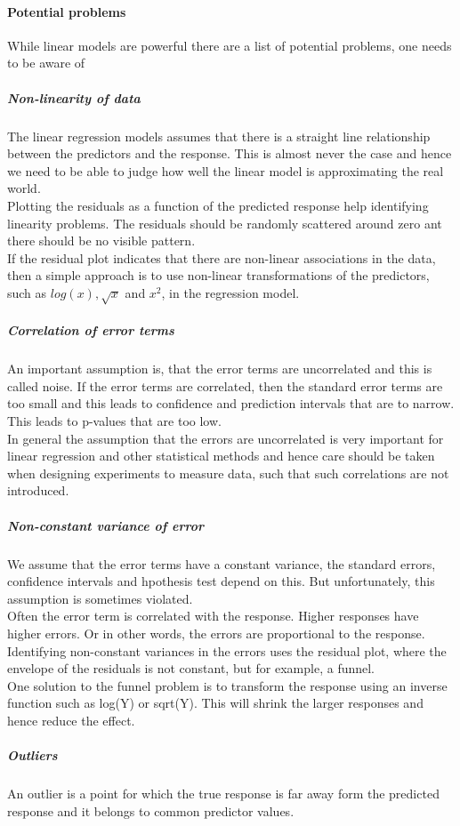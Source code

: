 \documentclass[../document.tex]{subfiles}
\begin{document}
	\paragraph{Potential problems}
	While linear models are powerful there are a list of potential problems, one needs to be aware of
	\subparagraph{Non-linearity of data}
	The linear regression models assumes that there is a straight line relationship between the predictors and the response. This is almost never the case and hence we need to be able to judge how well the linear model is approximating the real world.\\
	Plotting the residuals as a function of the predicted response help identifying linearity problems. The residuals should be randomly scattered around zero ant there should be no visible pattern.\\
	If the residual plot indicates that there are non-linear associations in the data, then a simple approach is to use non-linear transformations of the predictors, such as \(log(x), \sqrt{x}\) and \(x^2\), in the regression model.
	\subparagraph{Correlation of error terms}
	An important assumption is, that the error terms are uncorrelated and this is called noise. If the error terms are correlated, then the standard error terms are too small and this leads to confidence and prediction intervals that are to narrow. This leads to p-values that are too low.\\
	In general the assumption that the errors are uncorrelated is very important for linear regression and other statistical methods and hence care should be taken when designing experiments to measure data, such that such correlations are not introduced.
	\subparagraph{Non-constant variance of error}
	We assume that the error terms have a constant variance, the standard errors, confidence intervals and hpothesis test depend on this. But unfortunately, this assumption is sometimes violated.\\
	Often the error term is correlated with the response. Higher responses have higher errors. Or in other words, the errors are proportional to the response.\\
	Identifying non-constant variances in the errors uses the residual plot, where the envelope of the residuals is not constant, but for example, a funnel.\\
	One solution to the funnel problem is to transform the response using an inverse function such as log(Y) or sqrt(Y). This will shrink the larger responses and hence reduce the effect.
	\subparagraph{Outliers}
	An outlier is a point for which the true response is far away form the predicted response and it belongs to common predictor values.\\
\end{document}
